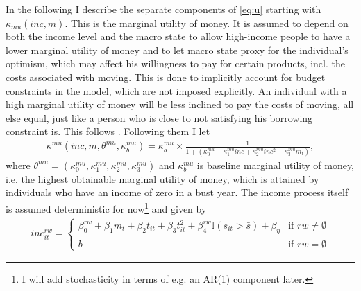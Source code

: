 In the following I describe the separate components of \eqref{eq:u} starting with $\kappa_{mu}(inc,m)$. This is the marginal utility of money. It is assumed to depend on both the income level and the macro state to allow high-income people to have a lower marginal utility of money and to let macro state proxy for the individual's optimism, which may affect his willingness to pay for certain products, incl. the costs associated with moving. This is done to implicitly account for budget constraints in the model, which are not imposed explicitly. An individual with a high marginal utility of money will be less inclined to pay the costs of moving, all else equal, just like a person who is close to not satisfying his borrowing constraint is. This follows \citet{GillinghamEtAl2015}. Following them I let
\begin{align*}
\kappa^{mu}(inc,m,\theta^{mu},\kappa^{mu}_b)=\kappa^{mu}_b\times\frac{1}{1+(\kappa_0^{mu}+\kappa_1^{mu}inc+\kappa_2^{mu}inc^2+\kappa_3^{mu}m_t)},
\end{align*}
where $\theta^{mu}=(\kappa_0^{mu},\kappa_1^{mu},\kappa_2^{mu},\kappa_3^{mu})$ and $\kappa^{mu}_b$ is baseline marginal utility of money, i.e. the highest obtainable marginal utility of money, which is attained by individuals who have an income of zero in a bust year. The income process itself is assumed deterministic for now\footnote{I will add stochasticity in terms of e.g. an AR(1) component later.} and given by 
\begin{align}
inc_{it}^{rw} = \begin{cases} \beta_0^{rw} + \beta_1 m_t + \beta_2 t_{it} + \beta_3 t_{it}^2 + \beta_4^{rw} \mathbb{I}{(s_{it}>\bar{s})} + \beta_{\eta} & \text{if } rw\neq\emptyset \\
			   b & \text{if } rw=\emptyset 
			\end{cases}
			\label{eq:inc}
\end{align}
